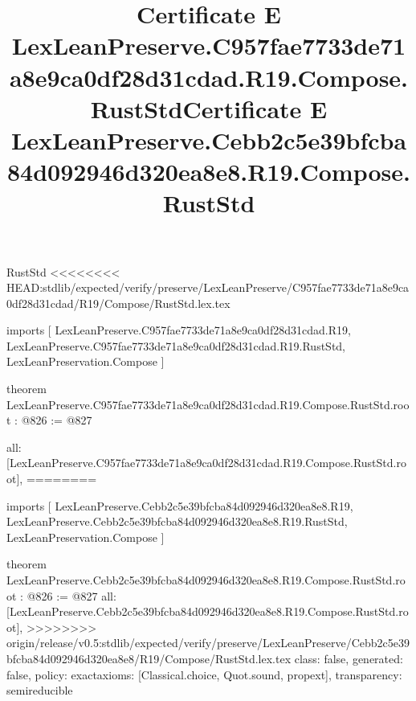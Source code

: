 \begin{lexlean}{RustStd}
<<<<<<<< HEAD:stdlib/expected/verify/preserve/LexLeanPreserve/C957fae7733de71a8e9ca0df28d31cdad/R19/Compose/RustStd.lex.tex
\title{Certificate E LexLeanPreserve.C957fae7733de71a8e9ca0df28d31cdad.R19.Compose.RustStd}
\begin{coremodule}
imports [
  LexLeanPreserve.C957fae7733de71a8e9ca0df28d31cdad.R19,
  LexLeanPreserve.C957fae7733de71a8e9ca0df28d31cdad.R19.RustStd,
  LexLeanPreservation.Compose
]

theorem LexLeanPreserve.C957fae7733de71a8e9ca0df28d31cdad.R19.Compose.RustStd.root : @826 := @827 {
  all: [LexLeanPreserve.C957fae7733de71a8e9ca0df28d31cdad.R19.Compose.RustStd.root],
========
\title{Certificate E LexLeanPreserve.Cebb2c5e39bfcba84d092946d320ea8e8.R19.Compose.RustStd}
\begin{coremodule}
imports [
  LexLeanPreserve.Cebb2c5e39bfcba84d092946d320ea8e8.R19,
  LexLeanPreserve.Cebb2c5e39bfcba84d092946d320ea8e8.R19.RustStd,
  LexLeanPreservation.Compose
]

theorem LexLeanPreserve.Cebb2c5e39bfcba84d092946d320ea8e8.R19.Compose.RustStd.root : @826 := @827 {
  all: [LexLeanPreserve.Cebb2c5e39bfcba84d092946d320ea8e8.R19.Compose.RustStd.root],
>>>>>>>> origin/release/v0.5:stdlib/expected/verify/preserve/LexLeanPreserve/Cebb2c5e39bfcba84d092946d320ea8e8/R19/Compose/RustStd.lex.tex
  class: false,
  generated: false,
  policy: exact{axioms: [Classical.choice, Quot.sound, propext]},
  transparency: semireducible
}


\end{coremodule}}
\end{coremodule}
\end{lexlean}
